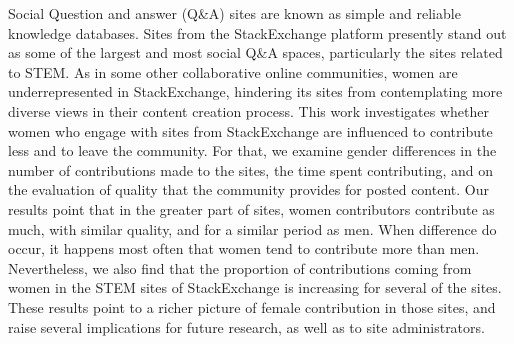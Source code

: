 Social Question and answer (Q\&A) sites are known as simple and reliable knowledge databases. Sites from the StackExchange platform presently stand out as some of the largest and most social Q\&A spaces, particularly the sites related to STEM. As in some other collaborative online communities, women are underrepresented in StackExchange, hindering its sites from contemplating more diverse views in their content creation process. This work investigates whether women who engage with sites from StackExchange are influenced to contribute less and to leave the community.  For that, we examine gender differences in the number of contributions made to the sites, the time spent contributing, and on the evaluation of quality that the community provides for posted content. Our results point that in the greater part of sites, women contributors contribute as much, with similar quality, and for a similar period as men. When difference do occur, it happens most often that women tend to contribute more than men. 
Nevertheless, we also find that the proportion of contributions coming from women in the STEM sites of StackExchange is increasing for several of the sites. These results point to a richer picture of female contribution in those sites, and raise several implications for future research, as well as to site administrators.  